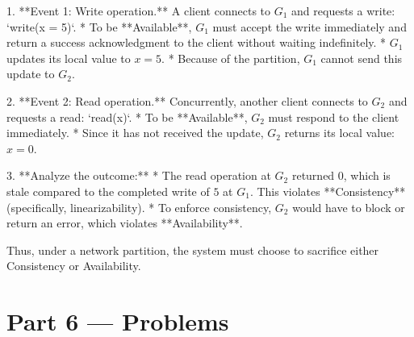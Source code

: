 \documentclass[12pt, a4paper]{book}
\begin{document}
\begin{problembox}
\begin{enumerate}[label=\textbf{E\arabic*.}]
        1. **Event 1: Write operation.**
           A client connects to $G_1$ and requests a write: `write(x = 5)`.
           * To be **Available**, $G_1$ must accept the write immediately and return a success acknowledgment to the client without waiting indefinitely.
           * $G_1$ updates its local value to $x = 5$.
           * Because of the partition, $G_1$ cannot send this update to $G_2$.
           
        2. **Event 2: Read operation.**
           Concurrently, another client connects to $G_2$ and requests a read: `read(x)`.
           * To be **Available**, $G_2$ must respond to the client immediately.
           * Since it has not received the update, $G_2$ returns its local value: $x = 0$.
           
        3. **Analyze the outcome:**
           * The read operation at $G_2$ returned $0$, which is stale compared to the completed write of $5$ at $G_1$. This violates **Consistency** (specifically, linearizability).
           * To enforce consistency, $G_2$ would have to block or return an error, which violates **Availability**.
        
        Thus, under a network partition, the system must choose to sacrifice either Consistency or Availability.
\end{enumerate}
\end{problembox}

\newpage

\section{Part 6 --- Problems}
\end{document}
